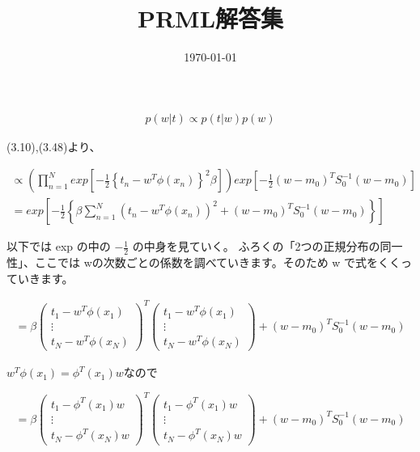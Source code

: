 \documentclass{jsarticle}
\title{PRML解答集}
\date{\today}
\begin{document}
\maketitle

\begin{align*}
    p(w|t) \propto p(t|w)p(w)
\end{align*}

(3.10),(3.48)より、

\begin{align*}
    \propto \left( \prod_{n=1}^N exp\left[ -\frac{1}{2} \left\{ t_n - w^T \phi(x_n) \right\}^2 \beta \right] \right) exp\left[ -\frac{1}{2} (w - m_0)^TS_0^{-1}(w - m_0) \right] \\
    = exp\left[  -\frac{1}{2} \left\{ \beta \sum_{n=1}^N \left( t_n - w^T\phi(x_n) \right)^2 + (w - m_0)^TS_0^{-1}(w - m_0) \right\} \right]
\end{align*}

以下では exp の中の $-\frac{1}{2}$ の中身を見ていく。
ふろくの「2つの正規分布の同一性」、ここでは wの次数ごとの係数を調べていきます。そのため w で式をくくっていきます。

\begin{align*}
    = \beta \left( \begin{array}{c}
        t_1 - w^T\phi(x_1) \\
        \vdots\\
        t_N - w^T\phi(x_N)
        \end{array} \right)^T
        \left( \begin{array}{c}
        t_1 - w^T\phi(x_1) \\
        \vdots\\
        t_N - w^T\phi(x_N)
        \end{array} \right)
        + (w - m_0)^TS_0^{-1}(w - m_0)
\end{align*}


$w^T\phi(x_1) = \phi^T(x_1)w$なので

\[
    = \beta \left( \begin{array}{c}
        t_1 - \phi^T(x_1)w \\
        \vdots\\
        t_N - \phi^T(x_N)w
        \end{array} \right)^T
        \left( \begin{array}{c}
        t_1 - \phi^T(x_1)w \\
        \vdots\\
        t_N - \phi^T(x_N)w
        \end{array} \right)
        + (w - m_0)^TS_0^{-1}(w - m_0)
    \]
\end{document}
